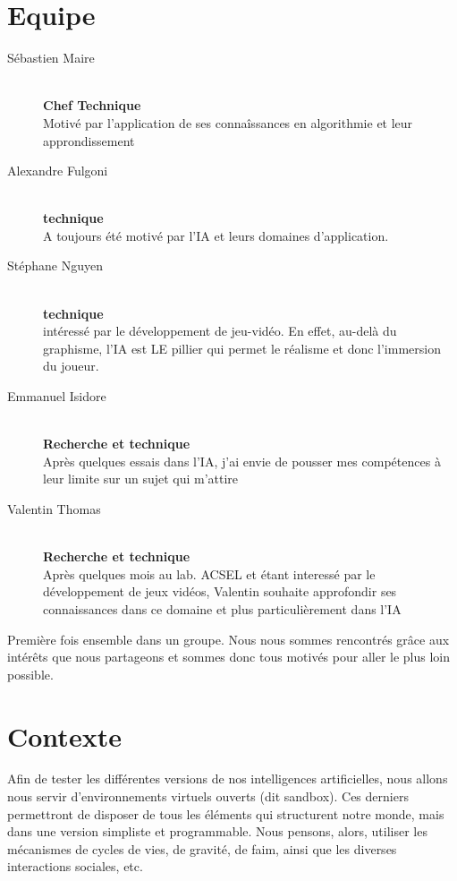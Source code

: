 \documentclass[a4paper]{report}
\begin{document}
  \section*{Equipe}
    \begin{description}
      \item[Sébastien Maire] \hfill \\
        \textbf{Chef Technique} \\
        Motivé par l'application de ses connaîssances en algorithmie et leur approndissement
      \item[Alexandre Fulgoni] \hfill \\
        \textbf{technique} \\
        A toujours été motivé par l'IA et leurs domaines d'application.
      \item[Stéphane Nguyen] \hfill \\
        \textbf{technique} \\
        intéressé par le développement de jeu-vidéo. En effet,
        au-delà du graphisme, l’IA est LE pillier qui permet le réalisme
        et donc l’immersion du joueur.
      \item[Emmanuel Isidore] \hfill \\
        \textbf{Recherche et technique} \\
       Après quelques essais dans l'IA, j'ai envie de pousser mes comp\'etences à leur limite sur un sujet qui m'attire
      \item[Valentin Thomas] \hfill \\
         \textbf{Recherche et technique} \\
         Après quelques mois au lab. ACSEL et \'etant interess\'e par le d\'eveloppement de jeux vid\'eos, Valentin souhaite approfondir ses connaissances dans ce domaine et plus particulièrement dans l'IA
         \end{description}

  \noindent
  Première fois ensemble dans un groupe. Nous nous sommes rencontrés grâce aux
  intérêts que nous partageons et sommes donc tous motivés pour aller le plus
  loin possible.

  \section*{Contexte}
  Afin de tester les différentes versions de nos intelligences artificielles, nous allons nous servir d'environnements virtuels ouverts (dit sandbox).
  Ces derniers permettront de disposer de tous les éléments qui structurent notre monde, mais dans une version simpliste et programmable.
  Nous pensons, alors, utiliser les mécanismes de cycles de vies, de gravité, de faim, ainsi que les diverses interactions sociales, etc.
\end{document}
